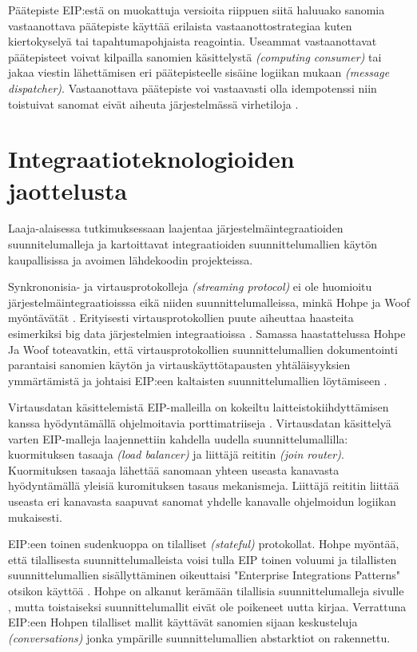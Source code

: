 \begin{itemize}
      Päätepiste EIP:estä on muokattuja versioita riippuen siitä haluuako sanomia vastaanottava päätepiste käyttää erilaista vastaanottostrategiaa kuten kiertokyselyä tai tapahtumapohjaista reagointia. Useammat vastaanottavat päätepisteet voivat kilpailla sanomien käsittelystä \textit{(computing consumer)} tai jakaa viestin lähettämisen eri päätepisteelle sisäine logiikan mukaan \textit{(message dispatcher)}. Vastaanottava päätepiste voi vastaavasti olla idempotenssi niin toistuivat sanomat eivät aiheuta järjestelmässä virhetiloja \citep[sivu~106]{Hohpe2004}.

\end{itemize}



\chapter{Integraatioteknologioiden jaottelusta}

Laaja-alaisessa tutkimuksessaan \citep{Ritter2017} laajentaa järjestelmäintegraatioiden suunnitelumalleja ja kartoittavat integraatioiden suunnittelumallien käytön kaupallisissa ja avoimen lähdekoodin projekteissa.

Synkrononisia- ja  virtausprotokolleja \textit{(streaming protocol)} ei  ole huomioitu järjestelmäintegraatioisssa eikä niiden suunnittelumalleissa, minkä Hohpe ja Woof myöntävätät \citep{Zimmermann2016}. Erityisesti virtausprotokollien puute aiheuttaa haasteita esimerkiksi big data järjestelmien integraatioissa \citep{Ritter2017}.
Samassa haastattelussa Hohpe Ja Woof toteavatkin, että virtausprotokollien suunnittelumallien dokumentointi parantaisi sanomien käytön ja virtauskäyttötapausten yhtäläisyyksien ymmärtämistä ja johtaisi EIP:een kaltaisten suunnittelumallien löytämiseen \citep{Ritter2017}.

Virtausdatan käsittelemistä EIP-malleilla on kokeiltu laitteistokiihdyttämisen kanssa hyödyntämällä ohjelmoitavia porttimatriiseja \citep{DannRitter2017}. Virtausdatan käsittelyä varten EIP-malleja laajennettiin kahdella uudella suunnittelumallilla: kuormituksen tasaaja \textit{(load balancer)} ja liittäjä reititin \textit{(join router)}. Kuormituksen tasaaja lähettää sanomaan yhteen useasta kanavasta hyödyntämällä yleisiä kuromituksen tasaus mekanismeja. Liittäjä reititin liittää useasta eri kanavasta saapuvat sanomat yhdelle kanavalle ohjelmoidun logiikan mukaisesti.


EIP:een toinen sudenkuoppa on tilalliset \textit{(stateful)} protokollat. Hohpe myöntää, että tilallisesta suunnittelumalleista voisi tulla EIP toinen voluumi ja tilallisten suunnittelumallien sisällyttäminen oikeuttaisi "Enterprise Integrations Patterns" otsikon käyttöä \citep{Zimmermann2016}.
Hohpe on alkanut kerämään tilallisia suunnittelumalleja sivulle \citep{conversationPatterns}, mutta toistaiseksi suunnittelumallit eivät ole poikeneet uutta kirjaa. Verrattuna EIP:een Hohpen tilalliset mallit käyttävät sanomien sijaan keskusteluja \textit{(conversations)} jonka ympärille suunnittelumallien abstarktiot on rakennettu.



